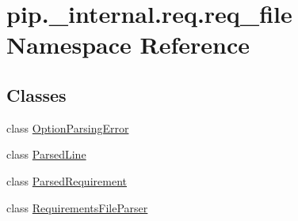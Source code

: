\hypertarget{namespacepip_1_1__internal_1_1req_1_1req__file}{}\section{pip.\+\_\+internal.\+req.\+req\+\_\+file Namespace Reference}
\label{namespacepip_1_1__internal_1_1req_1_1req__file}
\subsection*{Classes}
\begin{DoxyCompactItemize}
\item 
class \hyperlink{classpip_1_1__internal_1_1req_1_1req__file_1_1OptionParsingError}{Option\+Parsing\+Error}
\item 
class \hyperlink{classpip_1_1__internal_1_1req_1_1req__file_1_1ParsedLine}{Parsed\+Line}
\item 
class \hyperlink{classpip_1_1__internal_1_1req_1_1req__file_1_1ParsedRequirement}{Parsed\+Requirement}
\item 
class \hyperlink{classpip_1_1__internal_1_1req_1_1req__file_1_1RequirementsFileParser}{Requirements\+File\+Parser}
\end{DoxyCompactItemize}
